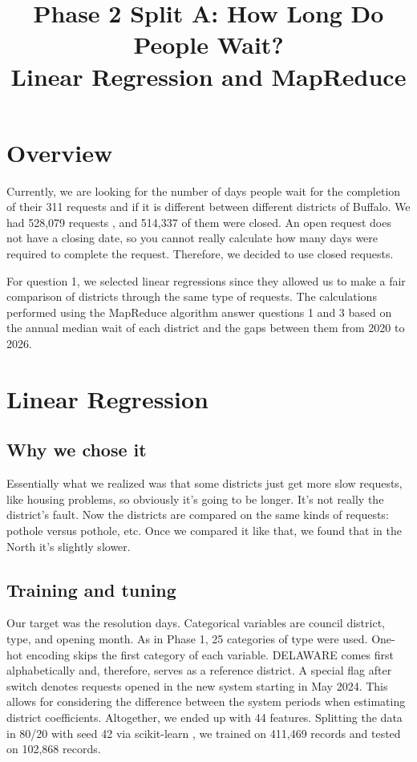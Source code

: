 \documentclass[conference]{IEEEtran}
\begin{document}
\title{Phase 2 Split A: How Long Do People Wait?\\Linear Regression and MapReduce}
\author{}
\maketitle
\raggedbottom

\section{Overview}
Currently, we are looking for the number of days people wait for the completion of their 311 requests and if it is different between different districts of Buffalo. We had 528,079 requests \cite{data1}, \cite{data2} and 514,337 of them were closed. An open request does not have a closing date, so you cannot really calculate how many days were required to complete the request. Therefore, we decided to use closed requests.

For question 1, we selected linear regressions since they allowed us to make a fair comparison of districts through the same type of requests. The calculations performed using the MapReduce algorithm answer questions 1 and 3 based on the annual median wait of each district and the gaps between them from 2020 to 2026.

\section{Linear Regression}

\subsection{Why we chose it}
Essentially what we realized was that some districts just get more slow requests, like housing problems, so obviously it's going to be longer. It's not really the district's fault. Now the districts are compared on the same kinds of requests: pothole versus pothole, etc. Once we compared it like that, we found that in the North it's slightly slower.

\subsection{Training and tuning}
Our target was the resolution days. Categorical variables are council district, type, and opening month. As in Phase 1, 25 categories of type were used. One-hot encoding skips the first category of each variable. DELAWARE comes first alphabetically and, therefore, serves as a reference district. A special flag after switch denotes requests opened in the new system starting in May 2024. This allows for considering the difference between the system periods when estimating district coefficients. Altogether, we ended up with 44 features. Splitting the data in 80/20 with seed 42 via scikit-learn \cite{sklearn}, we trained on 411,469 records and tested on 102,868 records.
\end{document}
